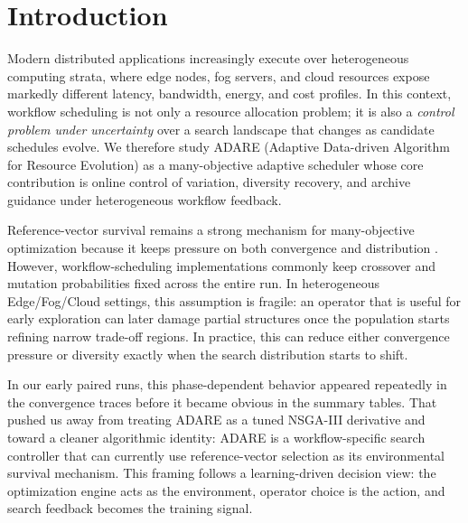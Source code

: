 \documentclass[runningheads]{llncs}
\begin{document}
\section{Introduction}
\begin{sloppypar}
Modern distributed applications increasingly execute over heterogeneous computing strata, where edge nodes, fog servers, and cloud resources expose markedly different latency, bandwidth, energy, and cost profiles. In this context, workflow scheduling is not only a resource allocation problem; it is also a \emph{control problem under uncertainty} over a search landscape that changes as candidate schedules evolve. We therefore study ADARE (Adaptive Data-driven Algorithm for Resource Evolution) as a many-objective adaptive scheduler whose core contribution is online control of variation, diversity recovery, and archive guidance under heterogeneous workflow feedback.
\end{sloppypar}

Reference-vector survival remains a strong mechanism for many-objective optimization because it keeps pressure on both convergence and distribution \cite{deb2014nsga3}. However, workflow-scheduling implementations commonly keep crossover and mutation probabilities fixed across the entire run. In heterogeneous Edge/Fog/Cloud settings, this assumption is fragile: an operator that is useful for early exploration can later damage partial structures once the population starts refining narrow trade-off regions. In practice, this can reduce either convergence pressure or diversity exactly when the search distribution starts to shift.

In our early paired runs, this phase-dependent behavior appeared repeatedly in the convergence traces before it became obvious in the summary tables. That pushed us away from treating ADARE as a tuned NSGA-III derivative and toward a cleaner algorithmic identity: ADARE is a workflow-specific search controller that can currently use reference-vector selection as its environmental survival mechanism. This framing follows a learning-driven decision view: the optimization engine acts as the environment, operator choice is the action, and search feedback becomes the training signal.
\end{document}
